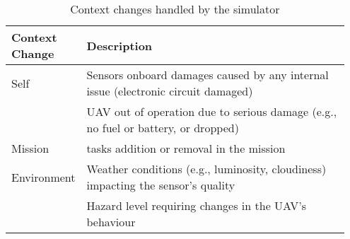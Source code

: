 \begin{table}[ht]
	\small
	\fontsize{12}{12}\selectfont
	\centering
	\caption{Context changes handled by the simulator}
	\label{table:context_changes}
	
	\begin{tabular}{p{0.15\linewidth}p{0.8\linewidth}}
	\hline 
		 \textbf{Context Change}
		& \textbf{Description} \\ [1ex]
	\hline	
	Self & Sensors onboard damages caused by any internal issue (electronic circuit damaged)  \\[1ex]
	& UAV out of operation due to serious damage (e.g., no fuel or battery, or dropped) \\[5ex]
	
	Mission & tasks addition or removal in the mission\\[5ex]
	
	Environment & Weather conditions (e.g., luminosity, cloudiness) impacting the sensor's quality \\[1ex]
	& Hazard level requiring changes in the UAV's behaviour \\[1ex]
	\hline
	\end{tabular}
\end{table} 
